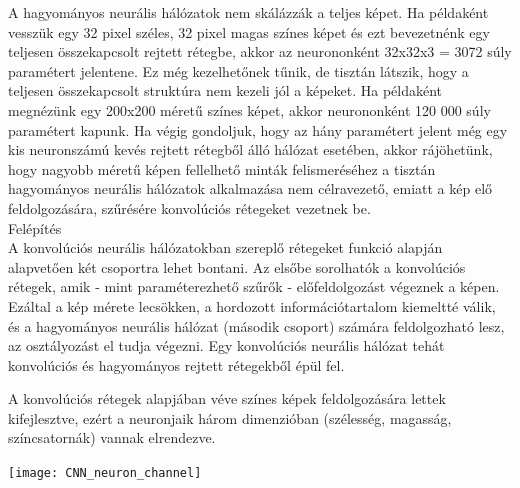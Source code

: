 A hagyományos neurális hálózatok nem skálázzák a teljes képet. Ha példaként vesszük egy 32 pixel széles, 32 pixel magas színes képet és ezt bevezetnénk egy teljesen összekapcsolt rejtett rétegbe, akkor az neurononként 32x32x3 = 3072 súly paramétert jelentene. Ez még kezelhetőnek tűnik, de tisztán látszik, hogy a teljesen összekapcsolt struktúra nem kezeli jól a képeket. Ha példaként megnézünk egy 200x200 méretű színes képet, akkor neurononként 120 000 súly paramétert kapunk. Ha végig gondoljuk, hogy az hány paramétert jelent még egy kis neuronszámú kevés rejtett rétegből álló hálózat esetében, akkor rájöhetünk, hogy nagyobb méretű képen fellelhető minták felismeréséhez a tisztán hagyományos neurális hálózatok alkalmazása nem célravezető, emiatt a kép elő feldolgozására, szűrésére konvolúciós rétegeket vezetnek be.\\

Felépítés\\

A konvolúciós neurális hálózatokban szereplő rétegeket funkció alapján alapvetően két csoportra lehet bontani. Az elsőbe sorolhatók a konvolúciós rétegek, amik - mint paraméterezhető szűrők - előfeldolgozást végeznek a képen. Ezáltal a kép mérete lecsökken, a hordozott információtartalom kiemeltté válik, és a hagyományos neurális hálózat (második csoport) számára feldolgozható lesz, az osztályozást el tudja végezni. Egy konvolúciós neurális hálózat tehát konvolúciós és hagyományos rejtett rétegekből épül fel.

A konvolúciós rétegek alapjában véve színes képek feldolgozására lettek kifejlesztve, ezért a neuronjaik három dimenzióban (szélesség, magasság, színcsatornák) vannak elrendezve.

\begin{center}
\texttt{[image: CNN\_neuron\_channel]}
\end{center}

